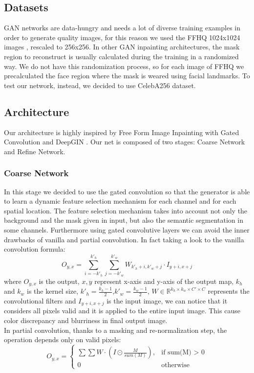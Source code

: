 \documentclass[10pt,twocolumn,letterpaper]{article}
\begin{document}
\subsection{Datasets}
GAN networks are data-hungry and needs a lot of diverse training examples in
order to generate quality images, for this reason we used the FFHQ 1024x1024
images \cite{karras2019style}, rescaled to 256x256.  In other GAN inpainting
architectures, the mask region to reconstruct is usually calculated during the
training in a randomized way.  We do not have this randomization process, so for
each image of FFHQ we precalculated the face region where the mask is weared
using facial landmarks.  To test our network, instead, we decided to use CelebA256 dataset.

\subsection{Architecture}
Our architecture is highly inspired by Free Form Image Inpainting with Gated
Convolution \cite{yu2019free} and DeepGIN \cite{li2020deepgin}.
Our net is composed of two stages: Coarse Network and Refine Network.
\subsubsection{Coarse Network}
In this stage we decided to use the gated convolution so that the generator is
able to learn a dynamic feature selection mechanism for each channel and for
each spatial location. The feature selection mechanism takes into account not
only the background and the mask given in input, but also the semantic
segmentation in some channels.
Furthermore using gated convolutive layers we can avoid the inner drawbacks of
vanilla and partial convolution. In fact taking a look to the vanilla
convolution formula:
\begin{equation}
    O_{y,x} = \sum_{i=-k'_h}^{k'_h}\sum_{j=-k'_w}^{k'_w} W_{k'_h + i, k'_w + j} \cdot I_{y + i, x + j}
\end{equation}
where \(O_{y,x}\) is the output, \(x,y\) represent x-axis and y-axis of the output map, \(k_h\) and \(k_w\) is the kernel size, \(k'_h = \frac{k_h - 1}{2}\),\(k'_w = \frac{k_w - 1}{2}\), \(W \in \mathbb{R}^{k_h \times k_w \times C' \times C}\) represents the convolutional filters and \(I_{y + i, x + j}\) is the input image, we can notice that it considers all pixels valid and it is applied to the entire input image. This cause color discrepancy and blurriness in final output image.
\\
In partial convolution, thanks to a masking and re-normalization step, the operation depends only on valid pixels:
\begin{equation}
    O_{y,x} = \begin{cases}
    \sum \sum W \cdot (I \odot \frac{M}{sum(M)}), & \text{if sum(M) \(>\) 0} \\ 0 & \text{otherwise}
    \end{cases}
\end{equation}
\end{document}

